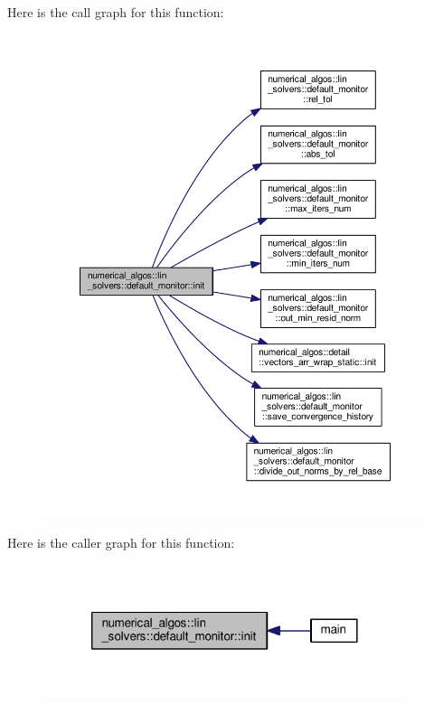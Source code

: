 Here is the call graph for this function\-:\nopagebreak
\begin{figure}[H]
\begin{center}
\leavevmode
\includegraphics[width=350pt]{classnumerical__algos_1_1lin__solvers_1_1default__monitor_a63f9d87378092ebb0877c099166b9c64_cgraph}
\end{center}
\end{figure}




Here is the caller graph for this function\-:\nopagebreak
\begin{figure}[H]
\begin{center}
\leavevmode
\includegraphics[width=300pt]{classnumerical__algos_1_1lin__solvers_1_1default__monitor_a63f9d87378092ebb0877c099166b9c64_icgraph}
\end{center}
\end{figure}


